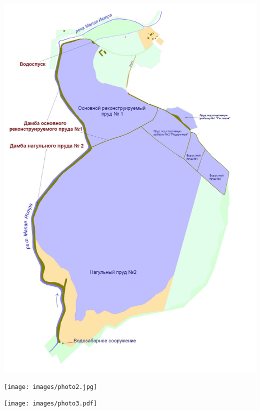 \documentclass[a4paper,12pt]{article}
\begin{document}
\begin{minipage}[t]{0.3\textwidth}
    \includegraphics[width=\textwidth]{images/photo.jpg}
\end{minipage}
\begin{minipage}[b]{0.3\textwidth}
    \texttt{[image: images/photo2.jpg]}
\end{minipage}
\begin{minipage}[c]{0.3\textwidth}
    \texttt{[image: images/photo3.pdf]}
\end{minipage}
\end{document}
